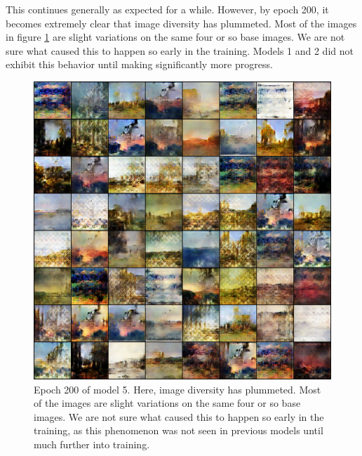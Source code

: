 \documentclass[11pt,letterpaper]{article}
\begin{document}
				This continues generally as expected for a while.
				However, by epoch 200, it becomes extremely clear that image diversity has plummeted.
				Most of the images in figure \ref{fig:wa128:epoch200generator} are slight variations on the same four or so base images.
				We are not sure what caused this to happen so early in the training.
				Models 1 and 2 did not exhibit this behavior until making significantly more progress.
				\begin{figure}
					\centering
					\includegraphics[width=1.0\linewidth]{results/model5/epoch200_generator}
					\caption{Epoch 200 of model 5. Here, image diversity has plummeted. Most of the images are slight variations on the same four or so base images. We are not sure what caused this to happen so early in the training, as this phenomenon was not seen in previous models until much further into training.}
					\label{fig:wa128:epoch200generator}
				\end{figure}
\end{document}
